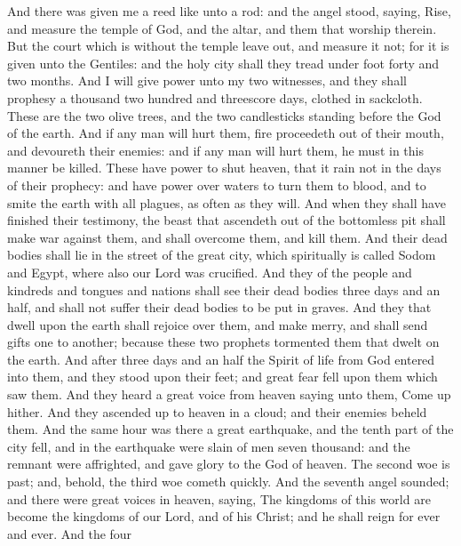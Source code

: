  And there was given me a reed like unto a rod: and the
angel stood, saying, Rise, and measure the temple of God, and the altar,
and them that worship therein.  But the court which is
without the temple leave out, and measure it not; for it is given unto
the Gentiles: and the holy city shall they tread under foot forty and
two months.  And I will give power unto my two witnesses,
and they shall prophesy a thousand two hundred and threescore days,
clothed in sackcloth.  These are the two olive trees, and
the two candlesticks standing before the God of the earth. 
And if any man will hurt them, fire proceedeth out of their mouth, and
devoureth their enemies: and if any man will hurt them, he must in this
manner be killed.  These have power to shut heaven, that it
rain not in the days of their prophecy: and have power over waters to
turn them to blood, and to smite the earth with all plagues, as often as
they will.  And when they shall have finished their
testimony, the beast that ascendeth out of the bottomless pit shall make
war against them, and shall overcome them, and kill them. 
And their dead bodies shall lie in the street of the great city, which
spiritually is called Sodom and Egypt, where also our Lord was
crucified.  And they of the people and kindreds and tongues
and nations shall see their dead bodies three days and an half, and
shall not suffer their dead bodies to be put in graves. 
And they that dwell upon the earth shall rejoice over them, and make
merry, and shall send gifts one to another; because these two prophets
tormented them that dwelt on the earth.  And after three
days and an half the Spirit of life from God entered into them, and they
stood upon their feet; and great fear fell upon them which saw them.
 And they heard a great voice from heaven saying unto them,
Come up hither. And they ascended up to heaven in a cloud; and their
enemies beheld them.  And the same hour was there a great
earthquake, and the tenth part of the city fell, and in the earthquake
were slain of men seven thousand: and the remnant were affrighted, and
gave glory to the God of heaven.  The second woe is past;
and, behold, the third woe cometh quickly.  And the seventh
angel sounded; and there were great voices in heaven, saying, The
kingdoms of this world are become the kingdoms of our Lord, and of his
Christ; and he shall reign for ever and ever.  And the four
